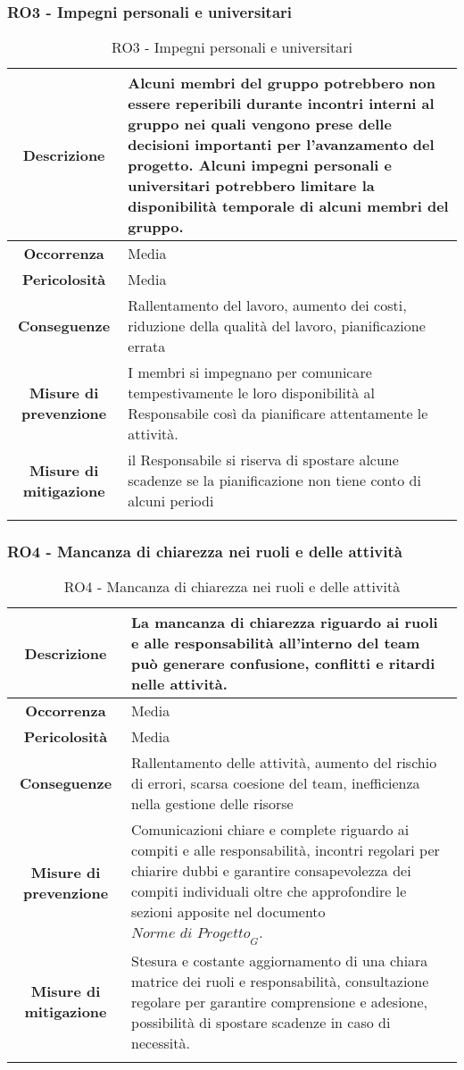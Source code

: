 %
%
\subsubsection[RO3]{RO3 - Impegni personali e universitari}\label{ro:3}
\begin{longtable}{|c|p{12cm}|}
\hline
\textbf{Descrizione} & Alcuni membri del gruppo potrebbero non essere reperibili durante incontri interni al gruppo nei quali vengono prese delle decisioni importanti per l'avanzamento del progetto. Alcuni impegni personali e universitari potrebbero limitare la disponibilità temporale di alcuni membri del gruppo. \\
\hline
\textbf{Occorrenza} & Media \\
\hline
\textbf{Pericolosità} & Media \\
\hline
\textbf{Conseguenze} & Rallentamento del lavoro, aumento dei costi, riduzione della qualità del lavoro, pianificazione errata \\
\hline
\textbf{Misure di prevenzione} & I membri si impegnano per comunicare tempestivamente le loro disponibilità al Responsabile così da pianificare attentamente le attività. \\
\hline
\textbf{Misure di mitigazione} &  il Responsabile si riserva di spostare alcune scadenze se la pianificazione non tiene conto di alcuni periodi\\
\hline
\caption{RO3 - Impegni personali e universitari}
\end{longtable}

%
%
\subsubsection[RO4]{RO4 - Mancanza di chiarezza nei ruoli e delle attività}\label{ro:4}
\begin{longtable}{|c|p{12cm}|}
\hline
\textbf{Descrizione} & La mancanza di chiarezza riguardo ai ruoli e alle responsabilità all’interno del team può generare confusione, conflitti e ritardi nelle attività. \\
\hline
\textbf{Occorrenza} & Media \\
\hline
\textbf{Pericolosità} & Media \\
\hline
\textbf{Conseguenze} & Rallentamento delle attività, aumento del rischio di errori, scarsa coesione del team, inefficienza nella gestione delle risorse \\
\hline
\textbf{Misure di prevenzione} & Comunicazioni chiare e complete riguardo ai compiti e alle responsabilità, incontri regolari per chiarire dubbi e garantire consapevolezza dei compiti individuali oltre che approfondire le sezioni apposite nel documento $\textit{Norme di Progetto}_G$. \\
\hline
\textbf{Misure di mitigazione} & Stesura e costante aggiornamento di una chiara matrice dei ruoli e responsabilità, consultazione regolare per garantire comprensione e adesione, possibilità di spostare scadenze in caso di necessità. \\
\hline
\caption{RO4 - Mancanza di chiarezza nei ruoli e delle attività}
\end{longtable}

